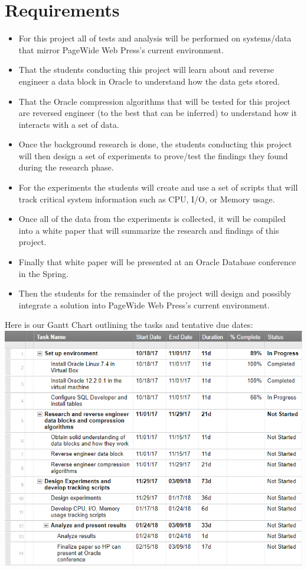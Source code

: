 \documentclass[10pt]{article}
\begin{document}
\section{Requirements}
\begin{itemize}
	\item For this project all of tests and analysis will be performed on systems/data that mirror PageWide Web Press's current environment.
	\item That the students conducting this project will learn about and reverse engineer a data block in Oracle to understand how the data gets stored.
	\item That the Oracle compression algorithms that will be tested for this project are reversed engineer (to the best that can be inferred) to understand how it interacts with a set of data.
	\item Once the background research is done, the students conducting this project will then design a set of experiments to prove/test the findings they found during the research phase.
	\item For the experiments the students will create and use a set of scripts that will track critical system information such as CPU, I/O, or Memory usage.
	\item Once all of the data from the experiments is collected, it will be compiled into a white paper that will summarize the research and findings of this project.
	\item Finally that white paper will be presented at an Oracle Database conference in the Spring.
	\item Then the students for the remainder of the project will design and possibly integrate a solution into PageWide Web Press's current environment.
\end{itemize}
Here is our Gantt Chart outlining the tasks and tentative due dates: \\
\includegraphics{gantt.png}
\end{document}
